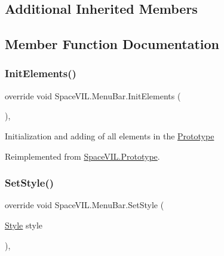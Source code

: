\subsection*{Additional Inherited Members}


\subsection{Member Function Documentation}
\mbox{\label{class_space_v_i_l_1_1_menu_bar_a9873e7466eac5668ecc9df715b35ce08}} 
\subsubsection{\texorpdfstring{Init\+Elements()}{InitElements()}}
{\footnotesize\ttfamily override void Space\+V\+I\+L.\+Menu\+Bar.\+Init\+Elements (\begin{DoxyParamCaption}{ }\end{DoxyParamCaption})\hspace{0.3cm}{\ttfamily [inline]}, {\ttfamily [virtual]}}



Initialization and adding of all elements in the \mbox{\hyperlink{class_space_v_i_l_1_1_prototype}{Prototype}} 



Reimplemented from \mbox{\hyperlink{class_space_v_i_l_1_1_prototype_ac3379fe02923ee155b5b0084abf27420}{Space\+V\+I\+L.\+Prototype}}.

\mbox{\label{class_space_v_i_l_1_1_menu_bar_a999e99bd760bb19092d309dff262ea5e}} 
\subsubsection{\texorpdfstring{Set\+Style()}{SetStyle()}}
{\footnotesize\ttfamily override void Space\+V\+I\+L.\+Menu\+Bar.\+Set\+Style (\begin{DoxyParamCaption}\item[{\mbox{\hyperlink{class_space_v_i_l_1_1_decorations_1_1_style}{Style}}}]{style }\end{DoxyParamCaption})\hspace{0.3cm}{\ttfamily [inline]}, {\ttfamily [virtual]}}



